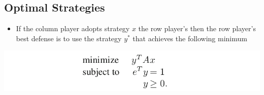 \documentclass[11pt]{article}
\begin{document}
\subsection{Optimal Strategies}
\label{sec:org11a773e}
\begin{itemize}
\item If the column player adopts strategy \(x\) the row player's then the row player's best defense is to use the strategy \(y^*\) that achieves the following minimum
\end{itemize}

\begin{center}
\includegraphics[width=.9\linewidth]{Game Theory/screenshot_2019-02-11_15-09-18.png}
\end{center}
\end{document}
